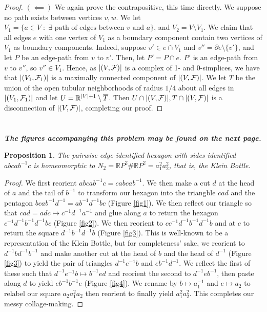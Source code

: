 \documentclass[english]{article}
\DeclarePairedDelimiter\abs{\lvert}{\rvert}%
\newcommand{\RR}{\mathbb{R}}
\newcommand{\prob}[1]{\setcounter{section}{#1-1}\section{}}
\newtheorem{proposition}[theorem]{Proposition}
\theoremstyle{remark}
\theoremstyle{definition}
\newcommand{\Fcal}{\mathcal{F}}
\begin{document}
\begin{proof}
$(\impliedby)$ We again prove the contrapositive, this time directly. We suppose no path exists between vertices $v,w$. We let $V_1=\{a\in V\;:\; \exists \text{ path of edges between }v\text{ and }a\}$, and $V_2=V\setminus V_1$. We claim that all edges $e$ with one vertex of $V_1$ as a boundary component contain two vertices of $V_1$ as boundary components. Indeed, suppose $v'\in e\cap V_1$ and $v''=\partial e\setminus \{v'\}$, and let $P$ be an edge-path from $v$ to $v'$. Then, let $P'=P\cap e$. $P'$ is an edge-path from $v$ to $v''$, so $v''\in V_1$. Hence, as $\abs{(V,\Fcal)}$ is a complex of 1- and 0-simplices, we have that $\abs{(V_1,\Fcal_1)}$ is a maximally connected component of $\abs{(V,\Fcal)}$. We let $T$ be the union of the open tubular neighborhoods of radius $1/4$ about all edges in $\abs{(V_1,\Fcal_1)}$ and let $U=\RR^{\abs{V}+1}\setminus \overline{T}$. Then $U\cap\abs{(V,\Fcal)},T\cap \abs{(V,\Fcal)}$ is a disconnection of $\abs{(V,\Fcal)}$, completing our proof.   
\end{proof}
\prob{3}\textbf{\emph{The figures accompanying this problem may be found on the next page.}} \begin{proposition}
	The pairwise edge-identified hexagon with sides identified $abcab^{-1}c$ is homeomorphic to $N_2=\RR P^2\# \RR P^2=a_1^2a_2^2$, that is, the Klein Bottle.
\end{proposition}
\begin{proof}
	We first reorient $abcab^{-1}c=cabcab^{-1}$. We then make a cut $d$ at the head of $a$ and the tail of $b^{-1}$ to transform our hexagon into the triangble $cad$ and the pentagon $bcab^{-1}d^{-1}=ab^{-1}d^{-1}bc$ (Figure \ref{fig1}). We then reflect our triangle so that $cad=adc\mapsto c^{-1}d^{-1}a^{-1}$ and glue along $a$ to return the hexagon $c^{-1}d^{-1}b^{-1}d^{-1}bc$ (Figure \ref{fig2}). We then reorient to $cc^{-1}d^{-1}b^{-1}d^{-1}b$ and  at $c$ to return the square $d^{-1}b^{-1}d^{-1}b$ (Figure \ref{fig3}). This is well-known to be a representation of the Klein Bottle, but for completeness' sake, we reorient to $d^{-1}bd^{-1}b^{-1}$ and make another cut at the head of $b$ and the head of $d^{-1}$ (Figure \ref{fig3}) to yield the pair of triangles $d^{-1}e^{-1}b$ and $eb^{-1}d^{-1}$. We reflect the first of these such that $d^{-1}e^{-1}b\mapsto b^{-1}ed$ and reorient the second to $d^{-1}eb^{-1}$, then paste along $d$ to yield $eb^{-1}b^{-1}e$ (Figure \ref{fig4}). We rename by $b\mapsto a_1^{-1}$ and $e\mapsto a_2$ to relabel our square $a_2a_1^2a_2$ then reorient to finally yield $a_1^2a_2^2$. This completes our messy collage-making.
\end{proof}
\end{document}

